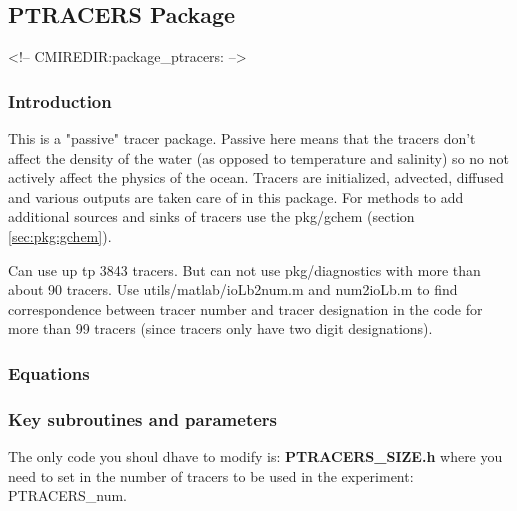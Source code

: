 \subsection {PTRACERS Package} 
\label{sec:pkg:ptracers}
\begin{rawhtml}
<!-- CMIREDIR:package_ptracers: -->
\end{rawhtml}

\subsubsection {Introduction}

This is a "passive" tracer package. Passive here means that the
tracers don't affect the density of the water (as opposed to
temperature and salinity) so no not actively affect the 
physics of the ocean. Tracers are initialized, advected, diffused
and various outputs are taken care of in this package.
For methods to add additional sources and sinks of tracers use the pkg/gchem
(section \ref{sec:pkg:gchem}).

Can use up tp 3843 tracers. But can not use pkg/diagnostics with more 
than about 90 tracers.
Use utils/matlab/ioLb2num.m and num2ioLb.m to find correspondence
between tracer number and tracer designation in the code for more
than 99 tracers (since
tracers only have two digit designations).

\subsubsection {Equations}

\subsubsection {Key subroutines and parameters}

The only code you shoul dhave to modify is:
{\bf PTRACERS\_SIZE.h} where you need to set in the number of tracers to
be used in the experiment:  PTRACERS\_num.

\vspace{.5cm}



